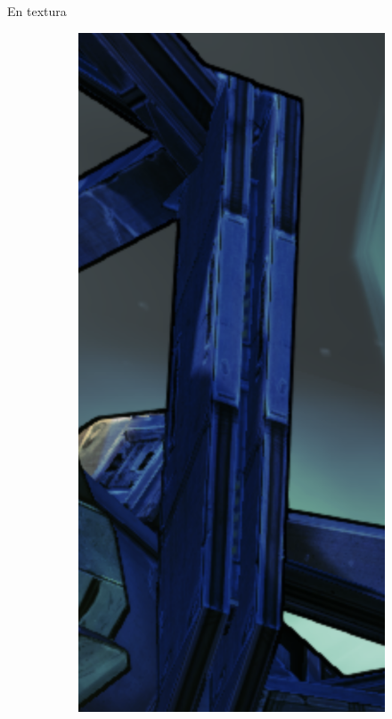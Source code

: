 \documentclass[table]{beamer}
\begin{document}
\begin{frame}[fragile]{En textura}
    \centering
    \begin{figure}[!htbp]
        \centering
        \begin{subfigure}[b]{0.45\textwidth}
            \includegraphics[width=\textwidth]{figures/ss2on.png}

\end{subfigure}
\end{figure}
\end{frame}
\end{document}
